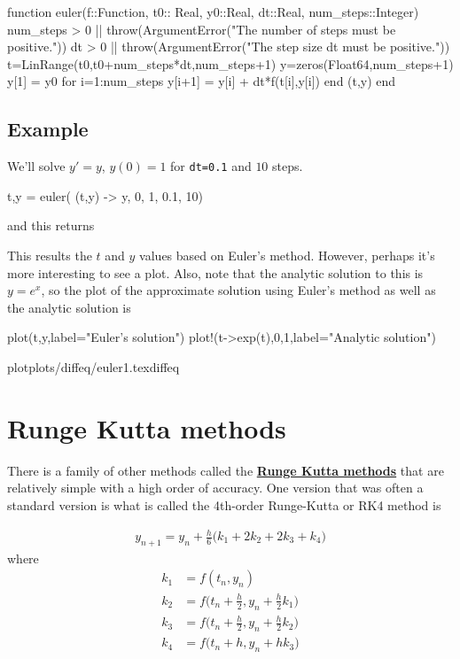 \begin{jlblock}[diffeq]
function euler(f::Function, t0:: Real, y0::Real, dt::Real, num_steps::Integer)
  num_steps > 0 || throw(ArgumentError("The number of steps must be positive."))
  dt > 0 || throw(ArgumentError("The step size dt must be positive."))
  t=LinRange(t0,t0+num_steps*dt,num_steps+1)
  y=zeros(Float64,num_steps+1)
  y[1] = y0
  for i=1:num_steps
    y[i+1] = y[i] + dt*f(t[i],y[i])
  end
  (t,y)
end
\end{jlblock}

\subsection{Example}

We'll solve $y'=y$, $y(0)=1$ for \verb!dt=0.1! and $10$ steps.  
\begin{jlblock}[diffeq]
t,y = euler( (t,y) -> y, 0, 1, 0.1, 10)
\end{jlblock}
and this returns  \printpythontex[verbatim]

This results the $t$ and $y$ values based on Euler's method.  However, perhaps it's more interesting to see a plot.  Also, note that the analytic solution to this is $y=e^x$, so the plot of the approximate solution using Euler's method as well as the analytic solution is 

\begin{jlblock}[diffeq]
plot(t,y,label="Euler's solution")
plot!(t->exp(t),0,1,label="Analytic solution")
\end{jlblock}

\begin{center}
plot{plots/diffeq/euler1.tex}{diffeq}
\end{center}

\section{Runge Kutta methods}

There is a family of other methods called the \href{https://en.wikipedia.org/wiki/Runge–Kutta_methods}{\textbf{Runge Kutta methods}} that are relatively simple with a high order of accuracy.  One version that was often a standard version is what is called the 4th-order Runge-Kutta or RK4 method is

\begin{align*}
y_{n+1} = y_n + \frac{h}{6} \bigl(k_1+2k_2+2k_3+k_4 \bigr)
\end{align*}
where
\begin{align*}
k_1 & = f(t_n,y_n) \\
k_2 & = f\biggl(t_n + \frac{h}{2}, y_n + \frac{h}{2} k_1 \biggr) \\
k_3 & = f\biggl(t_n + \frac{h}{2}, y_n + \frac{h}{2} k_2 \biggr) \\
k_4 & = f(t_n + h, y_n + h k_3 \biggr) \\
\end{align*}

